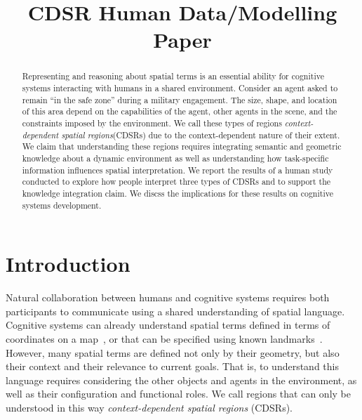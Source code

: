 \documentclass[11pt,letterpaper]{article}
\begin{document}
 

\title{CDSR Human Data/Modelling Paper}
 
\vskip 0.2in
 
\begin{abstract}
Representing and reasoning about spatial terms is an essential ability for cognitive systems interacting with humans in a shared environment.  Consider an agent asked to remain ``in the safe zone'' during a military engagement.  The size, shape, and location of this area depend on the capabilities of the agent, other agents in the scene, and the constraints imposed by the environment.  We call these types of regions \textit{context-dependent spatial regions}(CDSRs) due to the context-dependent nature of their extent.  We claim that understanding these regions requires integrating semantic and geometric knowledge about a dynamic environment as well as understanding how task-specific information influences spatial interpretation.  We report the results of a human study conducted to explore how people interpret three types of CDSRs and to support the knowledge integration claim.  We discss the implications for these results on cognitive systems development.
\end{abstract}

\section{Introduction} 
Natural collaboration between humans and cognitive systems requires both participants to communicate using a shared understanding of spatial language.  Cognitive systems can already understand spatial terms defined in terms of coordinates on a map~\cite{Zender2008a}, or that can be specified using known landmarks~\cite{brenneretal07ijcai}.  However, many spatial terms are defined not only by their geometry, but also their context and their relevance to current goals.  That is, to understand this language requires considering the other objects and agents in the environment, as well as their configuration and functional roles.  We call regions that can only be understood in this way \textit{context-dependent spatial regions} (CDSRs).
\end{document}
